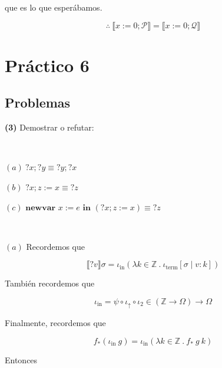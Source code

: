 \documentclass[article, 12pt]{article}
\begin{document}
que es lo que esperábamos.

\begin{equation*}
  \therefore  ~ \llbracket x:=0;\mathcal{P} \rrbracket = \llbracket
  x:=0;\mathcal{Q} \rrbracket
\end{equation*}

\pagebreak 

\section{Práctico 6}


\subsection{Problemas}
\begin{myframe}
  \textbf{(3)} Demostrar o refutar:

  ~

  $(a) ~ ?x; ?y \equiv ?y; ?x$

  $(b)$ $?x;z := x \equiv ? z$ 

  $(c)$ $\textbf{newvar } x := e \textbf{ in } (?x; z := x) \equiv ?z$
\end{myframe}

~

$(a)$ Recordemos que 

\begin{equation}
  \llbracket ?v \rrbracket \sigma = \iota_{\text{in}}\left( \lambda k \in
  \mathbb{Z} ~.~ \iota_{\text{term}} [\sigma \mid v : k] \right) 
\end{equation}

También recordemos que 

\begin{equation*}
  \iota_{\text{in}} = \psi \circ \iota_\uparrow \circ \iota_2 \in (\mathbb{Z}
  \to \Omega) \to \Omega
\end{equation*}

Finalmente, recordemos que 

\begin{equation}
  f_*(\iota_{\text{in}} ~ g) = \iota_{\text{in}} \left( \lambda k \in \mathbb{Z}
  ~ . ~ f_* ~ g ~ k\right) 
\end{equation}

Entonces
\end{document}
